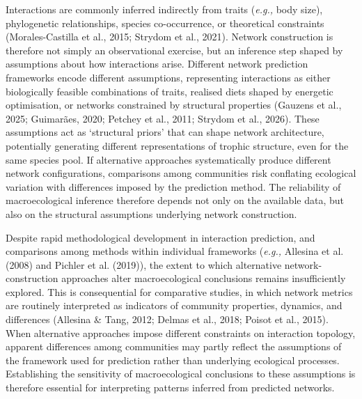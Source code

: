 \documentclass[
]{article}
\begin{document}
Interactions are commonly inferred indirectly from traits (\emph{e.g.,}
body size), phylogenetic relationships, species co-occurrence, or
theoretical constraints (Morales-Castilla et al., 2015; Strydom et al.,
2021). Network construction is therefore not simply an observational
exercise, but an inference step shaped by assumptions about how
interactions arise. Different network prediction frameworks encode
different assumptions, representing interactions as either biologically
feasible combinations of traits, realised diets shaped by energetic
optimisation, or networks constrained by structural properties (Gauzens
et al., 2025; Guimarães, 2020; Petchey et al., 2011; Strydom et al.,
2026). These assumptions act as `structural priors' that can shape
network architecture, potentially generating different representations
of trophic structure, even for the same species pool. If alternative
approaches systematically produce different network configurations,
comparisons among communities risk conflating ecological variation with
differences imposed by the prediction method. The reliability of
macroecological inference therefore depends not only on the available
data, but also on the structural assumptions underlying network
construction.

Despite rapid methodological development in interaction prediction, and
comparisons among methods within individual frameworks (\emph{e.g.,}
Allesina et al. (2008) and Pichler et al. (2019)), the extent to which
alternative network-construction approaches alter macroecological
conclusions remains insufficiently explored. This is consequential for
comparative studies, in which network metrics are routinely interpreted
as indicators of community properties, dynamics, and differences
(Allesina \& Tang, 2012; Delmas et al., 2018; Poisot et al., 2015). When
alternative approaches impose different constraints on interaction
topology, apparent differences among communities may partly reflect the
assumptions of the framework used for prediction rather than underlying
ecological processes. Establishing the sensitivity of macroecological
conclusions to these assumptions is therefore essential for interpreting
patterns inferred from predicted networks.
\end{document}
